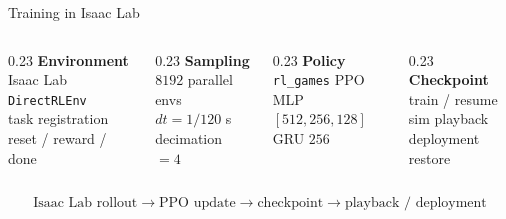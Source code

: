 \documentclass{beamer}
\begin{document}
\begin{frame}{Training in Isaac Lab}
    \small
    \centering
    \begin{columns}[T,onlytextwidth]
        \begin{column}{0.23\textwidth}
            \centering
            \textbf{\textcolor{maincolor}{Environment}}\\
            \vspace{0.2em}
            \scriptsize
            Isaac Lab \texttt{DirectRLEnv}\\
            task registration\\
            reset / reward / done
        \end{column}
        \begin{column}{0.23\textwidth}
            \centering
            \textbf{\textcolor{maincolor}{Sampling}}\\
            \vspace{0.2em}
            \scriptsize
            $8192$ parallel envs\\
            $dt=1/120$ s\\
            decimation $=4$
        \end{column}
        \begin{column}{0.23\textwidth}
            \centering
            \textbf{\textcolor{maincolor}{Policy}}\\
            \vspace{0.2em}
            \scriptsize
            \texttt{rl\_games} PPO\\
            MLP $[512,256,128]$\\
            GRU $256$
        \end{column}
        \begin{column}{0.23\textwidth}
            \centering
            \textbf{\textcolor{maincolor}{Checkpoint}}\\
            \vspace{0.2em}
            \scriptsize
            train / resume\\
            sim playback\\
            deployment restore
        \end{column}
    \end{columns}

    \vspace{0.9em}
    \[
        \text{Isaac Lab rollout}
        \rightarrow
        \text{PPO update}
        \rightarrow
        \text{checkpoint}
        \rightarrow
        \text{playback / deployment}
    \]


\end{frame}
\end{document}
